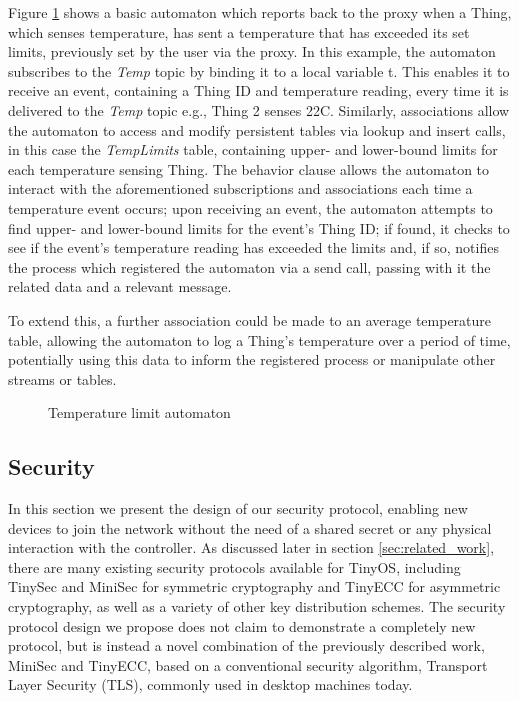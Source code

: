 \documentclass{mpaper}
\begin{document}
Figure \ref{fig:automaton} shows a basic automaton which reports back to the proxy when a Thing, which senses temperature, has sent a temperature that has exceeded its set limits, previously set by the user via the proxy. In this example, the automaton subscribes to the \textit{Temp} topic by binding it to a local variable t. This enables it to receive an event, containing a Thing ID and temperature reading, every time it is delivered to the \textit{Temp} topic e.g., Thing 2 senses 22C. Similarly, associations allow the automaton to access and modify persistent tables via lookup and insert calls, in this case the \textit{TempLimits} table, containing upper- and lower-bound limits for each temperature sensing Thing. The behavior clause allows the automaton to interact with the aforementioned subscriptions and associations each time a temperature event occurs; upon receiving an event, the automaton attempts to find upper- and lower-bound limits for the event's Thing ID; if found, it checks to see if the event's temperature reading has exceeded the limits and, if so, notifies the process which registered the automaton via a send call, passing with it the related data and a relevant message.

To extend this, a further association could be made to an average temperature table, allowing the automaton to log a Thing's temperature over a period of time, potentially using this data to inform the registered process or manipulate other streams or tables.
\begin{figure}[h!]

\caption{Temperature limit automaton}
\label{fig:automaton}
\end{figure}
\subsection{Security} %
\label{sub:security}
In this section we present the design of our security protocol, enabling new devices to join the network without the need of a shared secret or any physical interaction with the controller.
As discussed later in section \ref{sec:related_work}, there are many existing security protocols available for TinyOS, including TinySec\cite{TinySec} and MiniSec\cite{MiniSec} for symmetric cryptography and TinyECC\cite{TinyECC} for asymmetric cryptography, as well as a variety of other key distribution schemes\cite{TinyPK,TinyPBC,Shi2013235,ContikiSec,MessageBottle,CertificatePairwise,MizanurRahman2010858}. The security protocol design we propose does not claim to demonstrate a completely new protocol, but is instead a novel combination of the previously described work, MiniSec and TinyECC, based on a conventional security algorithm, Transport Layer Security (TLS), commonly used in desktop machines today.
\end{document}
